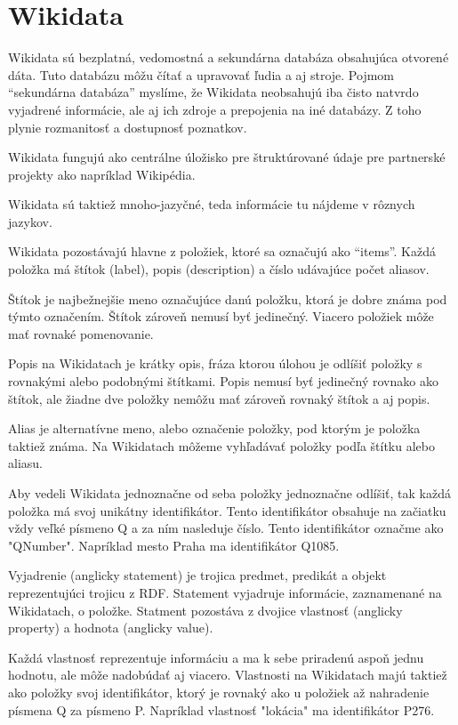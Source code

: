 \section{Wikidata}
Wikidata sú bezplatná, vedomostná a sekundárna databáza obsahujúca otvorené dáta.
Tuto databázu môžu čítať a upravovať ľudia a aj stroje.
Pojmom “sekundárna databáza” myslíme, že Wikidata neobsahujú iba čisto natvrdo vyjadrené informácie,
ale aj ich zdroje a prepojenia na iné databázy. Z toho plynie rozmanitosť a dostupnosť poznatkov.

Wikidata fungujú ako centrálne úložisko pre štruktúrované údaje pre partnerské projekty
ako napríklad Wikipédia.

Wikidata sú taktiež mnoho-jazyčné, teda informácie tu nájdeme v rôznych jazykov.

Wikidata pozostávajú hlavne z položiek, ktoré sa označujú ako “items”.
Každá položka má štítok (label), popis (description) a číslo udávajúce počet aliasov.

Štítok je najbežnejšie meno označujúce danú položku, ktorá je dobre známa pod
týmto označením. Štítok zároveň nemusí byť jedinečný. Viacero položiek môže mať rovnaké pomenovanie.

Popis na Wikidatach je krátky opis, fráza ktorou úlohou je odlíšiť položky s rovnakými alebo
podobnými štítkami. Popis nemusí byť jedinečný rovnako ako štítok, ale žiadne dve položky nemôžu mať zároveň rovnaký štítok a aj popis.

Alias je alternatívne meno, alebo označenie položky, pod ktorým je položka taktiež známa.
Na Wikidatach môžeme vyhľadávať položky podľa štítku alebo aliasu.

Aby vedeli Wikidata jednoznačne od seba položky jednoznačne odlíšiť, tak každá položka má svoj unikátny identifikátor.
Tento identifikátor obsahuje na začiatku vždy veľké písmeno Q a za ním nasleduje číslo. Tento identifikátor označme ako "QNumber".
Napríklad mesto Praha ma identifikátor Q1085.

Vyjadrenie (anglicky statement) je trojica predmet, predikát a objekt reprezentujúci trojicu z RDF. Statement vyjadruje informácie, zaznamenané na Wikidatach, o položke.
Statment pozostáva z dvojice vlastnosť (anglicky property) a hodnota (anglicky value).

Každá vlastnosť reprezentuje informáciu a ma k sebe priradenú aspoň jednu hodnotu, ale môže nadobúdať aj viacero.
Vlastnosti na Wikidatach majú taktiež
ako položky svoj identifikátor, ktorý je rovnaký ako u položiek až nahradenie písmena Q za písmeno P. Napríklad vlastnosť "lokácia" ma identifikátor P276.

